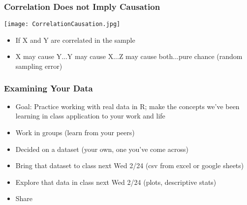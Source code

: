 \documentclass{beamer}
\begin{document}
\begin{frame}
 \frametitle<+->{Correlation Does not Imply Causation}
 \texttt{[image: CorrelationCausation.jpg]}
 \begin{itemize}[<+->]
   \item If X and Y are correlated in the sample
   \item X may cause Y...Y may cause X...Z may cause both...pure chance (random sampling error)
 \end{itemize}
\end{frame}

\begin{frame}
 \frametitle<+->{Examining Your Data}
 \begin{itemize}[<+->]
   \item Goal: Practice working with real data in R; make the concepts we've been learning in class application to your work and life
   \item Work in groups (learn from your peers)
   \item Decided on a dataset (your own, one you've come across)
   \item Bring that dataset to class next Wed 2/24 (csv from excel or google sheets)
   \item Explore that data in class next Wed 2/24 (plots, descriptive stats)
   \item Share
 \end{itemize}
\end{frame}
%

\end{document}
